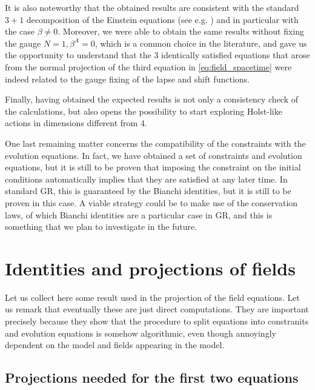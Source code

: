 \documentclass[a4paper, 11pt]{article}
\def\be{\beta}
\numberwithin{equation}{section}
\begin{document}
It is also noteworthy that the obtained results are consistent with the standard $3+1$ decomposition of the Einstein equations (see e.g. \cite{wald2009, gourgoulhon}) and in particular with the case $\be \neq 0$. Moreover, we were able to obtain the same results without fixing the gauge $N = 1, \be^A = 0$, which is a common choice in the literature, and gave us the opportunity to understand that the $3$ identically satisfied equations that arose from the normal projection of the third equation in \eqref{eq:field_spacetime} were indeed related to the gauge fixing of the lapse and shift functions. 

Finally, having obtained the expected results is not only a consistency check of the calculations, but also opens the possibility to start exploring Holst-like actions in dimensions different from $4$. 



One last remaining matter concerns the compatibility of the constraints with the evolution equations. In fact, we have obtained a set of constraints and evolution equations, but it is still to be proven that imposing the constraint on the initial conditions automatically implies that they are satisfied at any later time. In standard GR, this is guaranteed by the Bianchi identities, but it is still to be proven in this case. A viable strategy could be to make use of the conservation laws, of which Bianchi identities are a particular case in GR, and this is something that we plan to investigate in the future.

\appendix
{}
\renewcommand{\theequation}{\thesection\arabic{subsection}.\arabic{equation}}


\section{Identities and projections of fields }
\label{appendix:projections}

Let us collect here some result used in the projection of the field equations. Let us remark that eventually these are just direct computations. They are important precisely because they show that the procedure to split equations into constranits and evolution equations is somehow algorithmic, even though annoyingly dependent on the model and fields appearing in the model.

\subsection{Projections needed for the first two equations}
\end{document}
